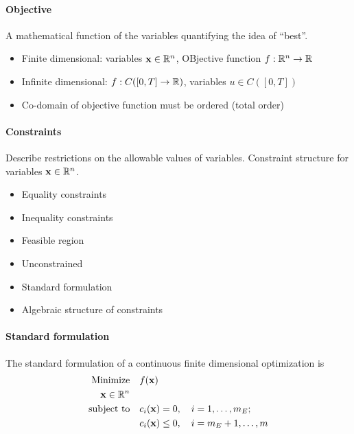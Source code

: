 \paragraph{Objective}
A mathematical function of the variables quantifying the idea of ``best''.
\begin{itemize}
    \item Finite dimensional: variables \(\mathbf{x} \in \mathbb{R}^n\), OBjective function \(f: \mathbb{R}^n \to \mathbb{R}\)
    \item Infinite dimensional: \(f: C([0, T] \to \mathbb{R})\), variables \(u \in C([0, T])\)
    \item Co-domain of objective function must be ordered (total order)
\end{itemize}

\paragraph{Constraints}
Describe restrictions on the allowable values of variables. Constraint structure for variables \(\mathbf{x} \in \mathbb{R}^n\).
\begin{itemize}
    \item Equality constraints
    \item Inequality constraints
    \item Feasible region
    \item Unconstrained
    \item Standard formulation
    \item Algebraic structure of constraints
\end{itemize}

\paragraph{Standard formulation}
The standard formulation of a continuous finite dimensional optimization is
\begin{align*}
    \text{Minimize} \quad   & f(\mathbf{x})                                          \\
    \mathbf{x} \in \mathbb{R}^n \quad     &                                              \\
    \text{subject to} \quad & c_i(\mathbf{x}) = 0, \quad i = 1,\dots, m_E;        \\
                            & c_i(\mathbf{x}) \leq 0, \quad i = m_E + 1, \dots, m
\end{align*}

